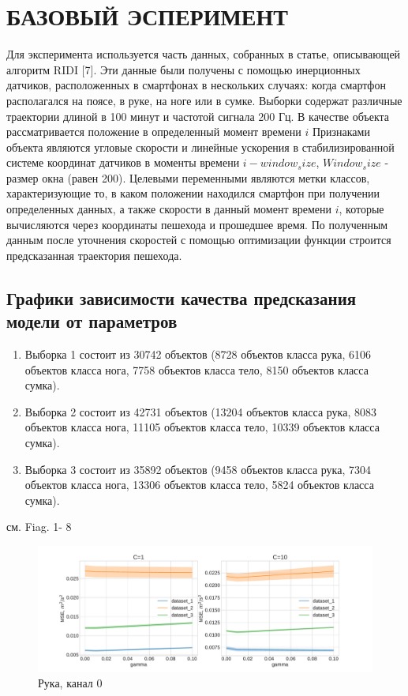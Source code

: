 \documentclass[letterpaper, 10 pt, conference]{ieeeconf}  %
\begin{document}
\section{БАЗОВЫЙ ЭСПЕРИМЕНТ}
Для эксперимента используется часть данных, собранных в статье, описывающей алгоритм RIDI [7]. Эти данные были получены с помощью инерционных датчиков, расположенных в смартфонах в нескольких случаях: когда смартфон располагался на поясе, в руке, на ноге или в сумке. Выборки содержат различные траектории длиной в 100 минут и частотой сигнала 200 Гц. В качестве объекта рассматривается положение в определенный момент времени $i$ Признаками объекта являются угловые скорости и линейные ускорения в стабилизированной системе координат датчиков в моменты времени $i - window_size$, $Window_size$ - размер окна (равен 200). Целевыми переменными
являются метки классов, характеризующие то, в каком положении находился смартфон при получении определенных данных, а также скорости в данный момент времени $i$, которые вычисляются через координаты пешехода и прошедшее время. По полученным данным после уточнения скоростей с помощью оптимизации функции  строится
предсказанная траектория пешехода.

\subsection{Графики зависимости качества предсказания модели от параметров}

\begin{enumerate}
    \item Выборка 1 состоит из 30742 объектов (8728 объектов класса рука, 6106 объектов класса нога, 7758 объектов класса тело, 8150 объектов класса сумка).
    
    \item Выборка 2 состоит из 42731 объектов (13204 объектов класса рука, 8083 объектов класса нога, 11105 объектов класса тело, 10339 объектов класса сумка).
    
    \item Выборка 3 состоит из 35892 объектов (9458 объектов класса рука, 7304 объектов класса нога, 13306 объектов класса тело, 5824 объектов класса сумка).
    
\end{enumerate}
    
см. Fiag. 1- 8
    
    \begin{figure}[H]
    \includegraphics[scale=0.2]{charts/handheld_chn0_C=10.pdf}
    \caption{Рука, канал 0}
    \label{fig:image}
    \end{figure}
    
\end{document}
